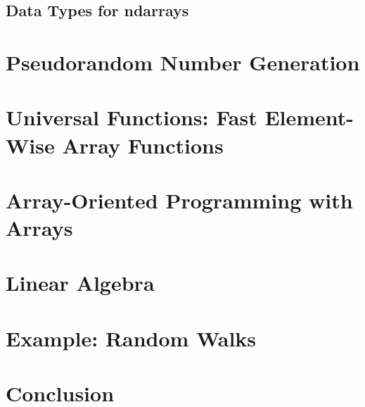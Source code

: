 \subsection{Data Types for ndarrays\label{Data Types for ndarrays}}
\section{Pseudorandom Number Generation}
\section{Universal Functions: Fast Element-Wise Array Functions}
\section{Array-Oriented Programming with Arrays}
\section{Linear Algebra}
\section{Example: Random Walks}
\section{Conclusion}
